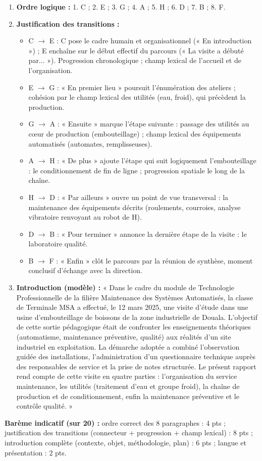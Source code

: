 \documentclass[11pt]{article}
\begin{document}
\begin{corrige}
\begin{enumerate}
\item \textbf{Ordre logique :} 1. C ; 2. E ; 3. G ; 4. A ; 5. H ; 6. D ; 7. B ; 8. F.
\item \textbf{Justification des transitions :}
\begin{itemize}
\item C $\to$ E : C pose le cadre humain et organisationnel (« En introduction ») ; E enchaîne sur le début effectif du parcours (« La visite a débuté par... »). Progression chronologique ; champ lexical de l'accueil et de l'organisation.
\item E $\to$ G : « En premier lieu » poursuit l'énumération des ateliers ; cohésion par le champ lexical des utilités (eau, froid), qui précèdent la production.
\item G $\to$ A : « Ensuite » marque l'étape suivante : passage des utilités au cœur de production (embouteillage) ; champ lexical des équipements automatisés (automates, remplisseuses).
\item A $\to$ H : « De plus » ajoute l'étape qui suit logiquement l'embouteillage : le conditionnement de fin de ligne ; progression spatiale le long de la chaîne.
\item H $\to$ D : « Par ailleurs » ouvre un point de vue transversal : la maintenance des équipements décrits (roulements, courroies, analyse vibratoire renvoyant au robot de H).
\item D $\to$ B : « Pour terminer » annonce la dernière étape de la visite : le laboratoire qualité.
\item B $\to$ F : « Enfin » clôt le parcours par la réunion de synthèse, moment conclusif d'échange avec la direction.
\end{itemize}
\item \textbf{Introduction (modèle) :} « Dans le cadre du module de Technologie Professionnelle de la filière Maintenance des Systèmes Automatisés, la classe de Terminale MSA a effectué, le 12 mars 2025, une visite d'étude dans une usine d'embouteillage de boissons de la zone industrielle de Douala. L'objectif de cette sortie pédagogique était de confronter les enseignements théoriques (automatisme, maintenance préventive, qualité) aux réalités d'un site industriel en exploitation. La démarche adoptée a combiné l'observation guidée des installations, l'administration d'un questionnaire technique auprès des responsables de service et la prise de notes structurée. Le présent rapport rend compte de cette visite en quatre parties : l'organisation du service maintenance, les utilités (traitement d'eau et groupe froid), la chaîne de production et de conditionnement, enfin la maintenance préventive et le contrôle qualité. »
\end{enumerate}
\textbf{Barème indicatif (sur 20) :} ordre correct des 8 paragraphes : 4 pts ; justification des transitions (connecteur + progression + champ lexical) : 8 pts ; introduction complète (contexte, objet, méthodologie, plan) : 6 pts ; langue et présentation : 2 pts.


\end{corrige}
\end{document}
